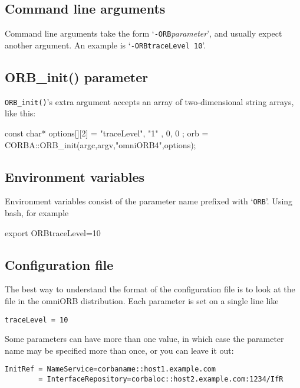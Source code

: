 \documentclass[11pt,twoside,a4paper]{book}
\newcommand{\op}[1]{\texttt{#1()}}
\newcommand{\cmdline}[1]{\texttt{#1}}
\newcommand{\file}{\begingroup \urlstyle{tt}\Url}
\begin{document}
\subsection{Command line arguments}

Command line arguments take the form
`\cmdline{-ORB}\textit{parameter}', and usually expect another
argument. An example is `\cmdline{-ORBtraceLevel 10}'.


\subsection{ORB\_init() parameter}

\op{ORB\_init}'s extra argument accepts an array of two-dimensional
string arrays, like this:

\begin{cxxlisting}
const char* options[][2] = { { "traceLevel", "1" }, { 0, 0 } }; 
orb = CORBA::ORB_init(argc,argv,"omniORB4",options); 
\end{cxxlisting}


\subsection{Environment variables}

Environment variables consist of the parameter name prefixed with
`\cmdline{ORB}'. Using bash, for example

\begin{makelisting}
export ORBtraceLevel=10
\end{makelisting}


\subsection{Configuration file}

The best way to understand the format of the configuration file is to
look at the \file{sample.cfg} file in the omniORB distribution. Each
parameter is set on a single line like

\begin{verbatim}
traceLevel = 10
\end{verbatim}

Some parameters can have more than one value, in which case the
parameter name may be specified more than once, or you can leave it
out:

\begin{verbatim}
InitRef = NameService=corbaname::host1.example.com
        = InterfaceRepository=corbaloc::host2.example.com:1234/IfR
\end{verbatim}
\end{document}
